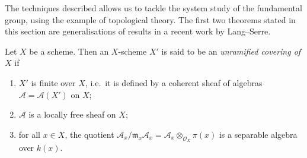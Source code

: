 \documentclass{article}
\newcommand{\oldpage}[1]{\marginpar{\footnotesize$\Big\vert$ \textit{p.~#1}}}
\theoremstyle{definition}
\theoremstyle{definition}
\theoremstyle{definition}
\theoremstyle{definition}
\theoremstyle{remark}
\begin{document}
The techniques described allows us to tackle the system study of the fundamental group, using the example of topological theory.
The first two theorems stated in this section are generalisations of results in a recent work by Lang--Serre.

Let \(X\) be a scheme.
\oldpage{182-18}Then an \(X\)-scheme \(X'\) is said to be an \emph{unramified covering of \(X\)} if

\begin{enumerate}
\def\labelenumi{\roman{enumi}.}
\item
  \(X'\) is finite over \(X\), i.e.~it is defined by a coherent sheaf of algebras \({\mathscr{A}}={\mathscr{A}}(X')\) on \(X\);
\item
  \({\mathscr{A}}\) is a locally free sheaf on \(X\);
\item
  for all \(x\in X\), the quotient \({\mathscr{A}}_x/{\mathfrak{m}}_x{\mathscr{A}}_x = {\mathscr{A}}_x\otimes_{{\mathscr{O}}_X}\pi(x)\) is a separable algebra over \(k(x)\).
\end{enumerate}
\end{document}
